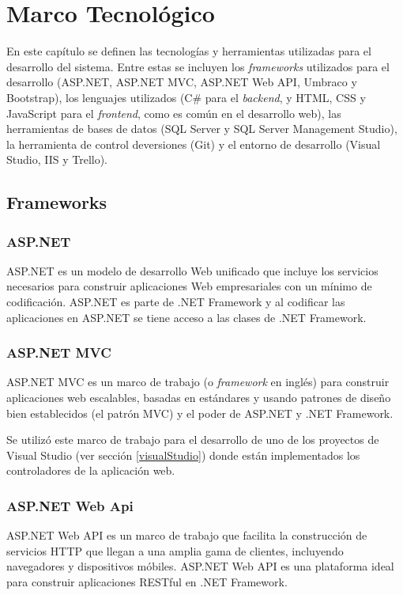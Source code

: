 \chapter{Marco Tecnológico}
En este capítulo se definen las tecnologías y herramientas utilizadas para el desarrollo del sistema. Entre estas se incluyen los \textit{frameworks} utilizados para el desarrollo (ASP.NET, ASP.NET MVC, ASP.NET Web API, Umbraco y Bootstrap), los lenguajes utilizados (C\# para el \textit{backend}, y HTML, CSS y JavaScript para el \textit{frontend}, como es común en el desarrollo web), las herramientas de bases de datos (SQL Server y SQL Server Management Studio), la herramienta de control deversiones (Git) y el entorno de desarrollo (Visual Studio, IIS y Trello).

\section{Frameworks}
    \subsection{ASP.NET}
    ASP.NET es un modelo de desarrollo Web unificado que incluye los servicios necesarios para construir aplicaciones Web empresariales con un mínimo de codificación. ASP.NET es parte de .NET Framework y al codificar las aplicaciones en ASP.NET se tiene acceso a las clases de .NET Framework. \cite{asp.netMicrosoft}

    \subsection{ASP.NET MVC}
    ASP.NET MVC es un marco de trabajo (o \textit{framework} en inglés) para construir aplicaciones web escalables, basadas en estándares y usando patrones de diseño bien establecidos (el patrón MVC) y el poder de ASP.NET y .NET Framework. \cite{asp.netMVCMicrosoft}

    Se utilizó este marco de trabajo para el desarrollo de uno de los proyectos de Visual Studio (ver sección \ref{visualStudio}) donde están implementados los controladores de la aplicación web.

    \subsection{ASP.NET Web Api}
    ASP.NET Web API es un marco de trabajo que facilita la construcción de servicios HTTP que llegan a una amplia gama de clientes, incluyendo navegadores y dispositivos móbiles. ASP.NET Web API es una plataforma ideal para construir aplicaciones RESTful en .NET Framework. \cite{asp.netWebAPIMicrosoft}

